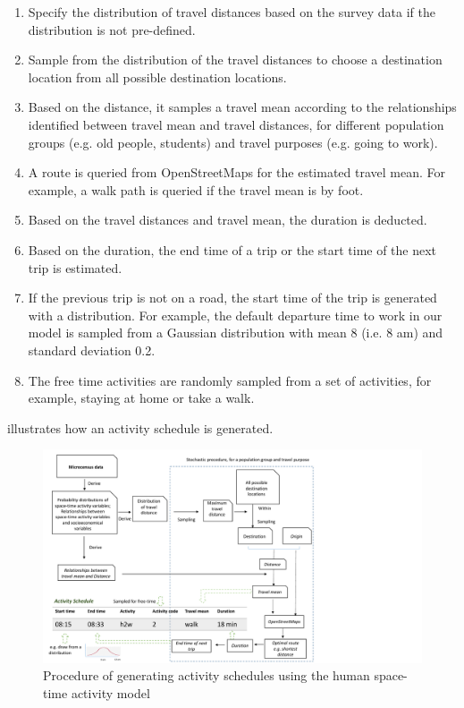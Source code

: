 \documentclass[]{article}
\begin{document}
\begin{enumerate}
    \item Specify the distribution of travel distances based on the survey data if the distribution is not pre-defined. 
    \item Sample from the distribution of the travel distances to choose a destination location from all possible destination locations.
    \item Based on the distance, it samples a travel mean according to the relationships identified between travel mean and travel distances, for different population groups  (e.g. old people, students) and travel purposes (e.g. going to work).
    \item A route is queried from OpenStreetMaps for the estimated travel mean. For example, a walk path is queried if the travel mean is by foot.  
    \item Based on the travel distances and travel mean, the duration is deducted. 
    \item Based on the duration, the end time of a trip or the start time of the next trip is estimated. 
    \item If the previous trip is not on a road, the start time of the trip is generated with a distribution. For example, the default departure time to work in our model is sampled from a Gaussian distribution with mean 8 (i.e. 8 am) and standard deviation 0.2. 
    \item The free time activities are randomly sampled from a set of activities, for example, staying at home or take a walk. 
\end{enumerate}

 illustrates how an activity schedule is generated. 

\begin{figure}
    \centering
    \includegraphics[width=\linewidth]{figure/scheduleflow_noenrich.pdf}
  \caption{Procedure of generating activity schedules using the human space-time activity model}
    \label{fig:detail}
\end{figure}
\end{document}
